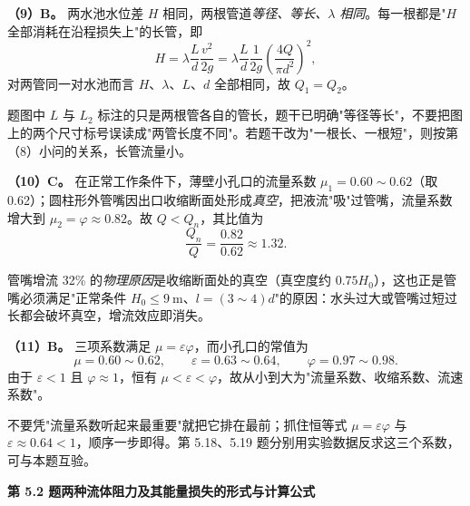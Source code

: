 \begin{jie}
\textbf{（9）B。} 两水池水位差 $H$ 相同，两根管道\emph{等径、等长、$\lambda$ 相同}。每一根都是"$H$ 全部消耗在沿程损失上"的长管，即
\[H=\lambda\frac{L}{d}\frac{v^2}{2g}=\lambda\frac{L}{d}\frac{1}{2g}\left(\frac{4Q}{\pi d^2}\right)^2,\]
对两管同一对水池而言 $H$、$\lambda$、$L$、$d$ 全部相同，故 $Q_1=Q_2$。
\end{jie}
\begin{yicuo}
题图中 $L$ 与 $L_2$ 标注的只是两根管各自的管长，题干已明确"等径等长"，不要把图上的两个尺寸标号误读成"两管长度不同"。若题干改为"一根长、一根短"，则按第（8）小问的关系，长管流量小。
\end{yicuo}

\begin{jie}
\textbf{（10）C。} 在正常工作条件下，薄壁小孔口的流量系数 $\mu_{1}=0.60\sim0.62$（取 0.62）；圆柱形外管嘴因出口收缩断面处形成\emph{真空}，把液流"吸"过管嘴，流量系数增大到 $\mu_{2}=\varphi\approx0.82$。故 $Q<Q_n$，其比值为
\[\frac{Q_n}{Q}=\frac{0.82}{0.62}\approx1.32.\]
\end{jie}
\begin{yicuo}
管嘴增流 32\% 的\emph{物理原因}是收缩断面处的真空（真空度约 $0.75H_0$），这也正是管嘴必须满足"正常条件 $H_0\le9\ \mathrm{m}$、$l=(3\sim4)d$"的原因：水头过大或管嘴过短过长都会破坏真空，增流效应即消失。
\end{yicuo}

\begin{jie}
\textbf{（11）B。} 三项系数满足 $\mu=\varepsilon\varphi$，而小孔口的常值为
\[\mu=0.60\sim0.62,\qquad \varepsilon=0.63\sim0.64,\qquad \varphi=0.97\sim0.98.\]
由于 $\varepsilon<1$ 且 $\varphi\approx1$，恒有 $\mu<\varepsilon<\varphi$，故从小到大为"流量系数、收缩系数、流速系数"。
\end{jie}
\begin{yicuo}
不要凭"流量系数听起来最重要"就把它排在最前；抓住恒等式 $\mu=\varepsilon\varphi$ 与 $\varepsilon\approx0.64<1$，顺序一步即得。第 5.18、5.19 题分别用实验数据反求这三个系数，可与本题互验。
\end{yicuo}

\noindent\textbf{第 5.2 题\quad 两种流体阻力及其能量损失的形式与计算公式}

